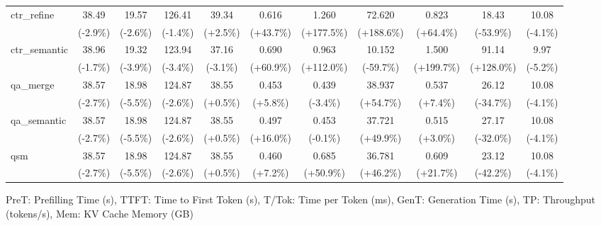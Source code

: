 \begin{table}[t]
{\begin{tabular}{l|cccccccccc}
    ctr\_refine & 38.49 & 19.57 & 126.41 & 39.34 & 0.616 & 1.260 & 72.620 & 0.823 & 18.43 & 10.08 \\
     & {\tiny\color{green!60!black}(-2.9\%)} & {\tiny\color{green!60!black}(-2.6\%)} & {\tiny\color{green!60!black}(-1.4\%)} & {\tiny\color{red!70!black}(+2.5\%)} & {\tiny\color{red!70!black}(+43.7\%)} & {\tiny\color{red!70!black}(+177.5\%)} & {\tiny\color{red!70!black}(+188.6\%)} & {\tiny\color{red!70!black}(+64.4\%)} & {\tiny\color{red!70!black}(-53.9\%)} & {\tiny\color{green!60!black}(-4.1\%)} \\
    ctr\_semantic & 38.96 & 19.32 & 123.94 & 37.16 & 0.690 & 0.963 & 10.152 & 1.500 & 91.14 & 9.97 \\
     & {\tiny\color{green!60!black}(-1.7\%)} & {\tiny\color{green!60!black}(-3.9\%)} & {\tiny\color{green!60!black}(-3.4\%)} & {\tiny\color{green!60!black}(-3.1\%)} & {\tiny\color{red!70!black}(+60.9\%)} & {\tiny\color{red!70!black}(+112.0\%)} & {\tiny\color{green!60!black}(-59.7\%)} & {\tiny\color{red!70!black}(+199.7\%)} & {\tiny\color{green!60!black}(+128.0\%)} & {\tiny\color{green!60!black}(-5.2\%)} \\
    qa\_merge & 38.57 & 18.98 & 124.87 & 38.55 & 0.453 & 0.439 & 38.937 & 0.537 & 26.12 & 10.08 \\
     & {\tiny\color{green!60!black}(-2.7\%)} & {\tiny\color{green!60!black}(-5.5\%)} & {\tiny\color{green!60!black}(-2.6\%)} & {\tiny\color{red!70!black}(+0.5\%)} & {\tiny\color{red!70!black}(+5.8\%)} & {\tiny\color{green!60!black}(-3.4\%)} & {\tiny\color{red!70!black}(+54.7\%)} & {\tiny\color{red!70!black}(+7.4\%)} & {\tiny\color{red!70!black}(-34.7\%)} & {\tiny\color{green!60!black}(-4.1\%)} \\
    qa\_semantic & 38.57 & 18.98 & 124.87 & 38.55 & 0.497 & 0.453 & 37.721 & 0.515 & 27.17 & 10.08 \\
     & {\tiny\color{green!60!black}(-2.7\%)} & {\tiny\color{green!60!black}(-5.5\%)} & {\tiny\color{green!60!black}(-2.6\%)} & {\tiny\color{red!70!black}(+0.5\%)} & {\tiny\color{red!70!black}(+16.0\%)} & {\tiny\color{green!60!black}(-0.1\%)} & {\tiny\color{red!70!black}(+49.9\%)} & {\tiny\color{red!70!black}(+3.0\%)} & {\tiny\color{red!70!black}(-32.0\%)} & {\tiny\color{green!60!black}(-4.1\%)} \\
    qsm & 38.57 & 18.98 & 124.87 & 38.55 & 0.460 & 0.685 & 36.781 & 0.609 & 23.12 & 10.08 \\
     & {\tiny\color{green!60!black}(-2.7\%)} & {\tiny\color{green!60!black}(-5.5\%)} & {\tiny\color{green!60!black}(-2.6\%)} & {\tiny\color{red!70!black}(+0.5\%)} & {\tiny\color{red!70!black}(+7.2\%)} & {\tiny\color{red!70!black}(+50.9\%)} & {\tiny\color{red!70!black}(+46.2\%)} & {\tiny\color{red!70!black}(+21.7\%)} & {\tiny\color{red!70!black}(-42.2\%)} & {\tiny\color{green!60!black}(-4.1\%)} \\
    \bottomrule
    \end{tabular}%
    }
    \vspace{0.1cm}
    \footnotesize{PreT: Prefilling Time (s), TTFT: Time to First Token (s), T/Tok: Time per Token (ms), GenT: Generation Time (s), TP: Throughput (tokens/s), Mem: KV Cache Memory (GB)}
\end{table}

